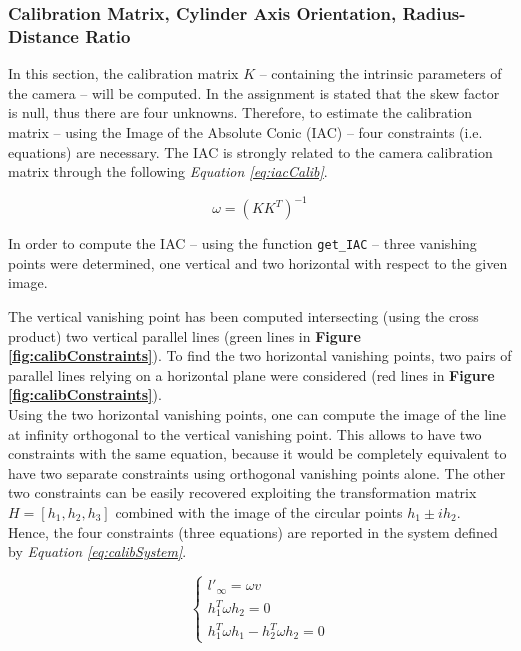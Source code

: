 \documentclass[12pt,a4paper]{article}
\begin{document}
\subsubsection{Calibration Matrix, Cylinder Axis Orientation, Radius-Distance Ratio}\label{sec:toRatioRadiusDistance}
In this section, the calibration matrix $K$ -- containing the intrinsic parameters of the camera --  will be computed. In the assignment is stated that the skew factor is null, thus there are four unknowns. Therefore, to estimate the calibration matrix -- using the Image of the Absolute Conic (IAC) -- four constraints (i.e. equations) are necessary. The IAC is strongly related to the camera calibration matrix through the following \textit{Equation \ref{eq:iacCalib}}.

\begin{equation}
    \omega = (KK^T)^{-1}
    \label{eq:iacCalib}
\end{equation}
\bigskip

In order to compute the IAC -- using the function \verb|get_IAC| -- three vanishing points were determined, one vertical and two horizontal with respect to the given image.

\pagebreak

The vertical vanishing point has been computed intersecting (using the cross product) two vertical parallel lines (green lines in \textbf{Figure \ref{fig:calibConstraints}}). To find the two horizontal vanishing points, two pairs of parallel lines relying on a horizontal plane were considered (red lines in \textbf{Figure \ref{fig:calibConstraints}}).\\

Using the two horizontal vanishing points, one can compute the image of the line at infinity orthogonal to the vertical vanishing point. This allows to have two constraints with the same equation, because it would be completely equivalent to have two separate constraints using orthogonal vanishing points alone. The other two constraints can be easily recovered exploiting the transformation matrix $H = [h_1,h_2,h_3]$ combined with the image of the circular points $h_1 \pm ih_2$.\\

Hence, the four constraints (three equations) are reported in the system defined by \textit{Equation \ref{eq:calibSystem}}.

\begin{equation}
    \begin{cases}
        l'_\infty = \omega v\\
        h_1^T\omega h_2 = 0\\
        h_1^T\omega h_1 - h_2^T\omega h_2 = 0
    \end{cases}
    \label{eq:calibSystem}
\end{equation}
\end{document}
